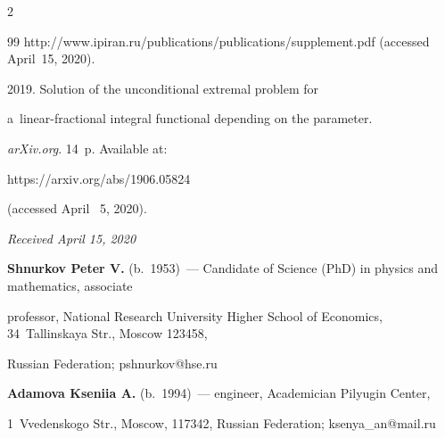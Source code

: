 \begin{multicols}{2}
{{\begin{thebibliography}{99}
{http://www.ipiran.ru/publications/\linebreak  publications/supplement.pdf} (accessed April~15, 2020).


 2019. Solution of the unconditional extremal problem for 

a~linear-fractional integral functional depending on the parameter. 

\textit{arXiv.org}. 14~p. Available at: {\sf 

https://arxiv.org/abs/1906.05824} (accessed April ~5, 2020).



\end{thebibliography}



 }

 }



\end{multicols}



\vspace*{-6pt}



\hfill{\small\textit{Received April 15, 2020}}









\Contr



\noindent

\textbf{Shnurkov Peter V.} (b.\ 1953)~--- Candidate of Science (PhD) in physics and mathematics, associate 

professor, National Research University Higher School of Economics, 34~Tallinskaya Str., Moscow 123458, 

Russian Federation; \mbox{pshnurkov@hse.ru}



\vspace*{3pt}



\noindent

\textbf{Adamova Kseniia A.} (b.\ 1994)~--- engineer, Academician Pilyugin Center, 

1~Vvedenskogo Str., Moscow, 117342, Russian Federation; \mbox{ksenya\_an@mail.ru}

\label{end\stat}



\renewcommand{\bibname}{\protect\rm Литература} 

